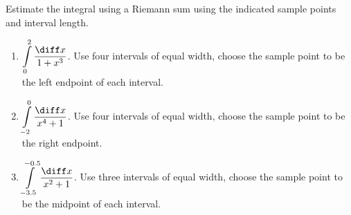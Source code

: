 Estimate the integral using a Riemann sum using the indicated sample points and interval length.
\begin{enumerate}
\item $\displaystyle \int\limits_0^2 \frac{\diff x}{1+x^3}$. Use four intervals of equal width, choose the sample point to be the left endpoint of each interval. 


\item $\displaystyle \int\limits_{-2}^{0} \frac{\diff x}{x^4+1} $. Use four intervals of equal width, choose the sample point to be the right endpoint. 


\item\label{problemRiemannSum-1div1plusxsquared} $\displaystyle \int\limits_{-3.5}^{-0.5} \frac{\diff x}{x^2+1} $. Use three intervals of equal width, choose the sample point to be the midpoint of each interval. 


\end{enumerate}


